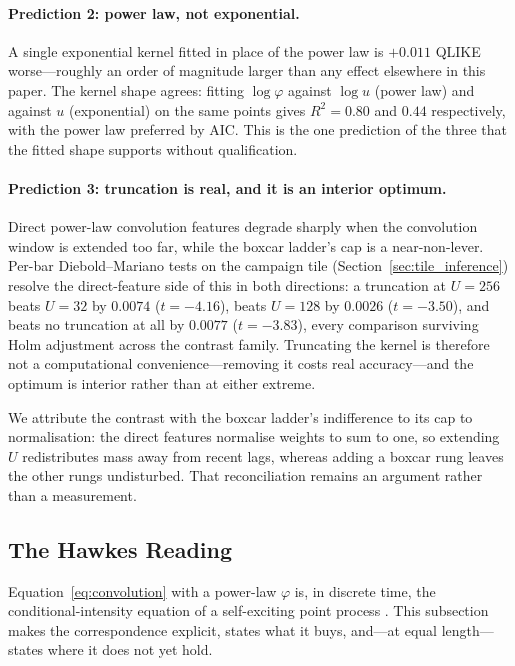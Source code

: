 \paragraph{Prediction 2: power law, not exponential.} A single exponential
kernel fitted in place of the power law is $+0.011$ QLIKE worse---roughly an
order of magnitude larger than any effect elsewhere in this paper. The kernel
shape agrees: fitting $\log\varphi$ against $\log u$ (power law) and against
$u$ (exponential) on the same points gives $R^2 = 0.80$ and $0.44$
respectively, with the power law preferred by AIC. This is the one prediction
of the three that the fitted shape supports without qualification.

\paragraph{Prediction 3: truncation is real, and it is an interior optimum.}
Direct power-law convolution features degrade sharply when the convolution
window is extended too far, while the boxcar ladder's cap is a near-non-lever.
Per-bar Diebold--Mariano tests on the campaign tile
(Section~\ref{sec:tile_inference}) resolve the direct-feature side of this in
both directions: a truncation at $U = 256$ beats $U = 32$ by $0.0074$
($t = -4.16$), beats $U = 128$ by $0.0026$ ($t = -3.50$), and beats no
truncation at all by $0.0077$ ($t = -3.83$), every comparison surviving Holm
adjustment across the contrast family. Truncating the kernel is therefore not a
computational convenience---removing it costs real accuracy---and the optimum
is interior rather than at either extreme.

We attribute the contrast with the boxcar ladder's indifference to its cap to
normalisation: the direct features normalise weights to sum to one, so
extending $U$ redistributes mass away from recent lags, whereas adding a boxcar
rung leaves the other rungs undisturbed. That reconciliation remains an
argument rather than a measurement.

\subsection{The Hawkes Reading}
\label{sec:hawkes}

Equation~\eqref{eq:convolution} with a power-law $\varphi$ is, in discrete
time, the conditional-intensity equation of a self-exciting point process
\citep{Hawkes1971}. This subsection makes the correspondence explicit, states
what it buys, and---at equal length---states where it does not yet hold.

